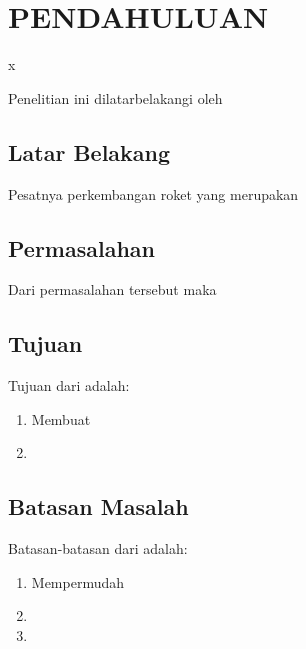 \chapter{PENDAHULUAN}
x\label{chap:pendahuluan}


Penelitian ini dilatarbelakangi oleh \lipsum[1][1-5]

\section{Latar Belakang}
\label{sec:latarbelakang}

Pesatnya perkembangan roket yang merupakan \lipsum[1]

\lipsum[2]

\section{Permasalahan}
\label{sec:permasalahan}

Dari permasalahan tersebut maka \lipsum[1][1-6]

\section{Tujuan}
\label{sec:Tujuan}

Tujuan dari \lipsum[1][1-3] adalah:

\begin{enumerate}[nolistsep]

  \item Membuat \lipsum[2][1-3]

  \item \lipsum[3][1-3]

\end{enumerate}

\section{Batasan Masalah}
\label{sec:batasanmasalah}

Batasan-batasan dari \lipsum[1][1-3] adalah:

\begin{enumerate}[nolistsep]

  \item Mempermudah \lipsum[2][1-3]

  \item \lipsum[3][1-5]

  \item \lipsum[4][1-5]

\end{enumerate}

